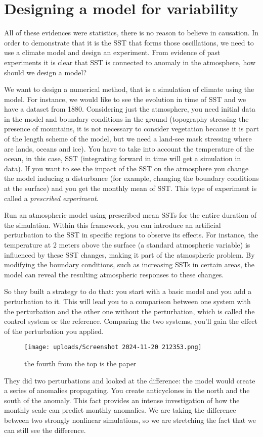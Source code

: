 \section{Designing a model for variability}
All of these evidences were statistics, there is no reason to believe in causation. In order to demonstrate that it is the SST that forms those oscillations, we need to use a climate model and design an experiment.
From evidence of past experiments it is clear that SST is connected to anomaly in the atmosphere, how should we design a model?

We want to design a numerical method, that is a  simulation of climate using the model.
For instance, we would like to see the evolution in time of SST and we have a dataset from 1880.
Considering just the atmosphere, you need initial data in the model and boundary conditions in the ground (topography stressing the presence of mountains, it is not necessary to consider vegetation because it is part of the length scheme of the model, but we need a land-see mask stressing where are lands, oceans and ice). You have to take into account the temperature of the ocean, in this case, SST (integrating forward in time will get a simulation in data). If you want to see the impact of the SST on the atmosphere you change the model inducing a disturbance (for example, changing the boundary conditions at the surface) and you get the monthly mean of SST. This type of experiment is called a \textit{prescribed experiment}.


Run an atmospheric model using prescribed mean SSTs for the entire duration of the simulation. Within this framework, you can introduce an artificial perturbation to the SST in specific regions to observe its effects. For instance, the temperature at 2 meters above the surface (a standard atmospheric variable) is influenced by these SST changes, making it part of the atmospheric problem. By modifying the boundary conditions, such as increasing SSTs in certain areas, the model can reveal the resulting atmospheric responses to these changes.



So they built a strategy to do that: you start with a basic model and you add a perturbation to it. This will lead you to a comparison between one system with the perturbation and the other one without the perturbation, which is called the control system or the reference. Comparing the two systems, you'll gain the effect of the perturbation you applied.

\begin{figure}[htpb]
	\centering
	\texttt{[image: uploads/Screenshot 2024-11-20 212353.png]}
	\caption{the fourth from the top is the paper}

\end{figure}
They did two perturbations and looked at the difference: the model would create a series of anomalies propagating. You create anticyclones in the north and the south of the anomaly. This fact provides an intense investigation of how the monthly scale can predict monthly anomalies. We are taking the difference between two strongly nonlinear simulations, so we are stretching the fact that we can still see the difference.

